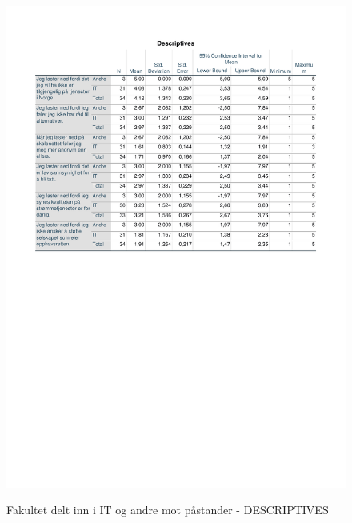 \begin{figure}[H]
    \centering
    \includegraphics[scale=0.7]{case_1/bilder/DESCRIPTIVES_IT-ANDRE-pastand.pdf}
    \label{fig:DESCRIPTIVES_IT/ANDRE-påstand}
    \caption{Fakultet delt inn i IT og andre mot påstander - DESCRIPTIVES}
    
\end{figure}

